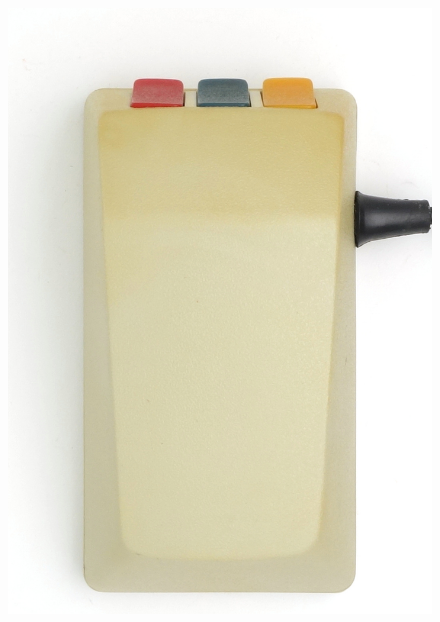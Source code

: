 \documentclass[11pt, a4paper]{article}
\begin{document}
\begin{figure}[h]
    \centering
    \includegraphics[scale=0.77]{1985_smc_contriver_magic_mouse/top_30.jpg}

\end{figure}
\end{document}
